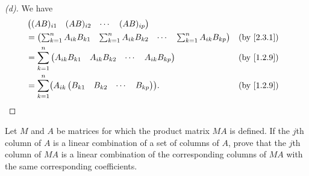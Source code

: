\begin{proof}[(d)]
  We have
  \begin{align*}
     & \begin{pmatrix}
         (AB)_{i 1} & (AB)_{i 2} & \cdots & (AB)_{i p}
       \end{pmatrix}                                                                                            \\
     & = \begin{pmatrix}
           \sum_{k = 1}^n A_{i k} B_{k 1} & \sum_{k = 1}^n A_{i k} B_{k 2} & \cdots & \sum_{k = 1}^n A_{i k} B_{k p}
         \end{pmatrix} &  & \text{(by \cref{2.3.1})}                              \\
     & = \sum_{k = 1}^n \begin{pmatrix}
                          A_{i k} B_{k 1} & A_{i k} B_{k 2} & \cdots & A_{i k} B_{k p}
                        \end{pmatrix}                                              &  & \text{(by \cref{1.2.9})}                                \\
     & = \sum_{k = 1}^n \pa{A_{i k} \begin{pmatrix}
                                        B_{k 1} & B_{k 2} & \cdots & B_{k p}
                                      \end{pmatrix}}.                                                               &  & \text{(by \cref{1.2.9})}
  \end{align*}
\end{proof}

\begin{ex}\label{ex:2.3.15}
  Let \(M\) and \(A\) be matrices for which the product matrix \(MA\) is defined.
  If the \(j\)th column of \(A\) is a linear combination of a set of columns of \(A\), prove that the \(j\)th column of \(MA\) is a linear combination of the corresponding columns of \(MA\) with the same corresponding coefficients.
\end{ex}

